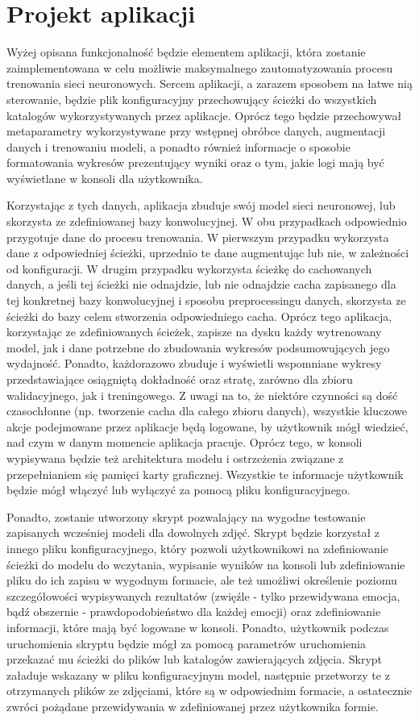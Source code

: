 \section{Projekt aplikacji}
Wyżej opisana funkcjonalność będzie elementem aplikacji, która zostanie zaimplementowana w celu możliwie maksymalnego zautomatyzowania procesu trenowania sieci neuronowych. Sercem aplikacji, a zarazem sposobem na łatwe nią sterowanie, będzie plik konfiguracyjny przechowujący ścieżki do wszystkich katalogów wykorzystywanych przez aplikacje. Oprócz tego będzie przechowywał metaparametry wykorzystywane przy wstępnej obróbce danych, augmentacji danych i trenowaniu modeli, a ponadto również informacje o sposobie formatowania wykresów prezentujący wyniki oraz o tym, jakie logi mają być wyświetlane w konsoli dla użytkownika.

Korzystając z tych danych, aplikacja zbuduje swój model sieci neuronowej, lub skorzysta ze zdefiniowanej bazy konwolucyjnej. W obu przypadkach odpowiednio przygotuje dane do procesu trenowania. W pierwszym przypadku wykorzysta dane z odpowiedniej ścieżki, uprzednio te dane augmentując lub nie, w zależności od konfiguracji. W drugim przypadku wykorzysta ścieżkę do cachowanych danych, a jeśli tej ścieżki nie odnajdzie, lub nie odnajdzie cacha zapisanego dla tej konkretnej bazy konwolucyjnej i sposobu preprocessingu danych, skorzysta ze ścieżki do bazy celem stworzenia odpowiedniego cacha. Oprócz tego aplikacja, korzystając ze zdefiniowanych ścieżek, zapisze na dysku każdy wytrenowany model, jak i dane potrzebne do zbudowania wykresów podsumowujących jego wydajność. Ponadto, każdorazowo zbuduje i wyświetli wspomniane wykresy przedstawiające osiągniętą dokładność oraz stratę, zarówno dla zbioru walidacyjnego, jak i treningowego. Z uwagi na to, że niektóre czynności są dość czasochłonne (np. tworzenie cacha dla całego zbioru danych), wszystkie kluczowe akcje podejmowane przez aplikacje będą logowane, by użytkownik mógł wiedzieć, nad czym w danym momencie aplikacja pracuje. Oprócz tego, w konsoli wypisywana będzie też architektura modelu i ostrzeżenia związane z przepełnianiem się pamięci karty graficznej. Wszystkie te informacje użytkownik będzie mógł włączyć lub wyłączyć za pomocą pliku konfiguracyjnego.

Ponadto, zostanie utworzony skrypt pozwalający na wygodne testowanie zapisanych wcześniej modeli dla dowolnych zdjęć. Skrypt będzie korzystał z innego pliku konfiguracyjnego, który pozwoli użytkownikowi na zdefiniowanie ścieżki do modelu do wczytania, wypisanie wyników na konsoli lub zdefiniowanie pliku do ich zapisu w wygodnym formacie, ale też umożliwi określenie poziomu szczegółowości wypisywanych rezultatów (zwięźle - tylko przewidywana emocja, bądź obszernie - prawdopodobieństwo dla każdej emocji) oraz zdefiniowanie informacji, które mają być logowane w konsoli. Ponadto, użytkownik podczas uruchomienia skryptu będzie mógł za pomocą parametrów uruchomienia przekazać mu ścieżki do plików lub katalogów zawierających zdjęcia. Skrypt załaduje wskazany w pliku konfiguracyjnym model, następnie przetworzy te z otrzymanych plików ze zdjęciami, które są w odpowiednim formacie, a ostatecznie zwróci pożądane przewidywania w zdefiniowanej przez użytkownika formie. 
